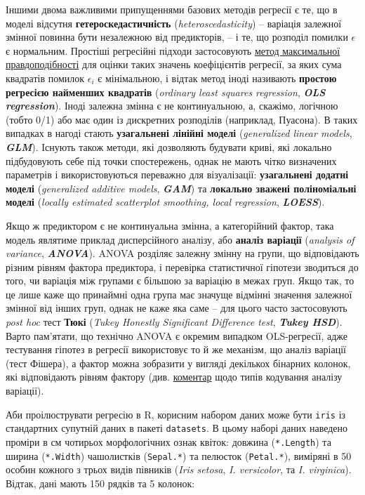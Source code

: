 \documentclass[
  11pt,
]{book}
\begin{document}
Іншими двома важливими припущеннями базових методів регресії є те, що в моделі відсутня \textbf{гетероскедастичність} (\emph{heteroscedasticity}) -- варіація залежної змінної повинна бути незалежною від предикторів, -- і те, що розподіл помилки \(\epsilon\) є нормальним. Простіші регресійні підходи застосовують \hyperref[mle]{метод максимальної правдоподібності} для оцінки таких значень коефіцієнтів регресії, за яких сума квадратів помилок \(\epsilon_i\) є мінімальною, і відтак метод іноді називають \textbf{простою регресією найменших квадратів} (\emph{ordinary least squares regression}, \textbf{\emph{OLS regression}}). Іноді залежна змінна є не континуальною, а, скажімо, логічною (тобто 0/1) або має один із дискретних розподілів (наприклад, Пуасона). В таких випадках в нагоді стають \textbf{узагальнені лінійні моделі} (\emph{generalized linear models}, \textbf{\emph{GLM}}). Існують також методи, які дозволяють будувати криві, які локально підбудовують себе під точки спостережень, однак не мають чітко визначених параметрів і використовуються переважно для візуалізації: \textbf{узагальнені додатні моделі} (\emph{generalized additive models}, \textbf{\emph{GAM}}) та \textbf{локально зважені поліноміальні моделі} (\emph{locally estimated scatterplot smoothing, local regression}, \textbf{\emph{LOESS}}).

Якщо ж предиктором є не континуальна змінна, а категорійний фактор, така модель являтиме приклад дисперсійного аналізу, або \textbf{аналіз варіації} (\emph{analysis of variance}, \textbf{\emph{ANOVA}}). ANOVA розділяє залежну змінну на групи, що відповідають різним рівням фактора предиктора, і перевірка статистичної гіпотези зводиться до того, чи варіація між групами є більшою за варіацію в межах груп. Якщо так, то це лише каже що принаймні одна група має значуще відмінні значення залежної змінної від інших груп, однак не каже яка саме -- для цього часто застосовують \emph{post hoc} тест \textbf{Тюкі} (\emph{Tukey Honestly Significant Difference test}, \textbf{\emph{Tukey HSD}}). Варто пам'ятати, що технічно ANOVA є окремим випадком OLS-регресії, адже тестування гіпотез в регресії використовує то й же механізм, що аналіз варіації (тест Фішера), а фактор можна зобразити у вигляді декількох бінарних колонок, які відповідають рівням фактору (див. \href{https://mcfromnz.wordpress.com/2011/03/02/anova-type-iiiiii-ss-explained/}{коментар} щодо типів кодування аналізу варіації).

Аби проілюструвати регресію в R, корисним набором даних може бути \texttt{iris} із стандартних супутній даних в пакеті \texttt{datasets}. В цьому наборі даних наведено проміри в см чотирьох морфологічних ознак квіток: довжина (\texttt{*.Length}) та ширина (\texttt{*.Width}) чашолистків (\texttt{Sepal.*}) та пелюсток (\texttt{Petal.*}), виміряні в 50 особин кожного з трьох видів півників (\emph{Iris setosa}, \emph{I. versicolor}, та \emph{I. virginica}). Відтак, дані мають 150 рядків та 5 колонок:
\end{document}
